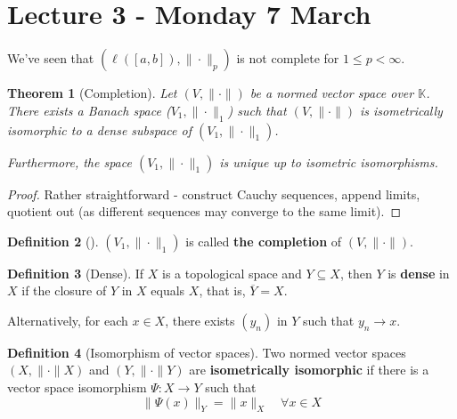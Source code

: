\documentclass[10pt, reqno, oneside]{amsart}
\theoremstyle{plain}%
\newtheorem{thm}{Theorem}[section]
\theoremstyle{definition}
\newtheorem{defn}[thm]{Definition}
\theoremstyle{remark}
\newcommand{\K}{\mathbb{K}}
\begin{document}
\section{Lecture 3 - Monday 7 March} %
\label{sec:lecture_3_monday_7_march}
We've seen that $(\ell([a,b]), \| \cdot \|_p)$ is not complete for $1 \leq p < \infty$.  

\begin{thm}[Completion] Let $(V, \| \cdot \| )$ be a normed vector space over $\K$.  There exists a Banach space ($V_1, \| \cdot \|_1$) such that $( V, \| \cdot \|)$ is isometrically isomorphic to a dense subspace of $(V_1, \| \cdot \|_1)$.  
	
	Furthermore, the space $( V_1, \| \cdot \|_1)$ is unique up to isometric isomorphisms.	
\end{thm}

\begin{proof}
	Rather straightforward - construct Cauchy sequences, append limits, quotient out (as different sequences may converge to the same limit).
\end{proof}

\begin{defn}[] $(V_1, \| \cdot \|_1)$ is called \textbf{the completion} of $(V, \| \cdot \|)$. 
\end{defn}

\begin{defn}[Dense]
	If $X$ is a topological space and $Y \subseteq X$, then $Y$ is \textbf{dense} in $X$ if the closure of $Y$ in $X$ equals $X$, that is, $\overline{Y} = X$.

Alternatively, for each $x \in X$, there exists $(y_n)$ in $Y$ such that $y_n \rightarrow x$.
\end{defn}

\begin{defn}[Isomorphism of vector spaces]
	Two normed vector spaces $(X, \| \cdot \|X)$ and $(Y, \| \cdot \|Y)$ are \textbf{isometrically isomorphic} if there is a vector space isomorphism $\Psi: X \rightarrow Y$ such that \[
		\| \Psi(x) \|_Y = \| x \|_X \quad \forall x \in X
	\]
\end{defn}
\end{document}
